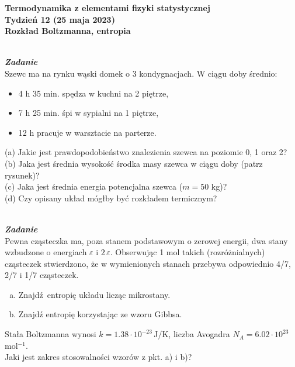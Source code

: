 \documentclass[11pt,a4paper]{article}
\newcounter{zadanie}\newcommand{\zadanie}[1][]{\addtocounter{zadanie}{1} ~\\  {\bf \emph{Zadanie \arabic{zadanie} #1 }} \\}
\begin{document}
\begin{centering}
\bf{\Large{Termodynamika z elementami fizyki statystycznej}}\\
Tydzień 12 (25 maja 2023)\\[5mm]
Rozkład Boltzmanna, entropia \\
\end{centering} 
\vspace{5mm}

\begin{figure}\vspace{-5mm}
\end{figure}
\zadanie
Szewc ma na rynku wąski domek o 3 kondygnacjach. W ciągu doby średnio:
\begin{itemize}
\item 4 h 35 min. spędza w kuchni na 2 piętrze,
\item 7 h 25 min. śpi w sypialni na 1 piętrze,
\item 12 h pracuje w warsztacie na parterze.
\end{itemize}
(a) Jakie jest prawdopodobieństwo znalezienia szewca na poziomie 0, 1 oraz 2?\\
(b) Jaka jest średnia wysokość środka masy szewca w ciągu doby (patrz rysunek)?\\
(c) Jaka jest średnia energia potencjalna szewca ($m=50$ kg)?\\
(d) Czy opisany układ mógłby być rozkładem termicznym? \\

\zadanie
Pewna cząsteczka ma, poza stanem podstawowym o zerowej energii, dwa stany wzbudzone o energiach $\varepsilon$ i $2\,\varepsilon$.
Obserwując 1 mol takich (rozróżnialnych) cząsteczek stwierdzono, że w wymienionych stanach przebywa odpowiednio 4/7, 2/7 i 1/7 cząsteczek.
\begin{enumerate}[a)]
\item Znajdź entropię układu licząc mikrostany. 
\item Znajdź entropię korzystając ze wzoru Gibbsa.
\end{enumerate}
Stała Boltzmanna wynosi $k = 1.38\cdot 10^{-23}\,$J/K, 
liczba Avogadra $N_A=6.02\cdot 10^{23}$\, mol$^{-1}$. \\
Jaki jest zakres stosowalności wzorów z pkt. a) i b)?
\end{document}
